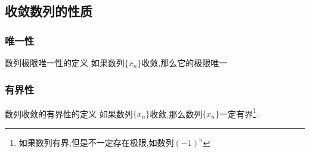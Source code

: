 \documentclass[8pt a4paper, oneside, UTF8]{ctexbook}
\begin{document}
\begin{sloppypar}
    \subsection{收敛数列的性质}
    \subsubsection{唯一性}
    \begin{defn}{数列极限唯一性的定义}{}
        如果数列$\{ x_n \}$收敛,那么它的极限唯一
    \end{defn}
    \subsubsection{有界性}
    \begin{defn}{数列收敛的有界性的定义}{}
        如果数列$\{x_n\}$收敛,那么数列$\{x_n\}$一定有界\footnote{如果数列有界,但是不一定存在极限,如数列$(-1)^n$}.
    \end{defn}

\end{sloppypar}
\end{document}
